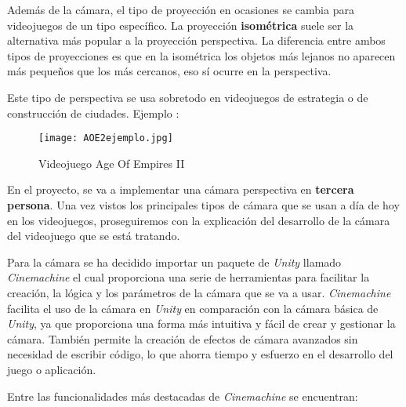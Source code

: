     Además de la cámara, el tipo de proyección en ocasiones se cambia para videojuegos de un tipo específico. La proyección \textbf{isométrica} suele ser la alternativa más popular a la proyección perspectiva. La diferencia entre ambos tipos de proyecciones es que en la isométrica los objetos más lejanos no aparecen más pequeños que los más cercanos, eso sí ocurre en la perspectiva.

    Este tipo de perspectiva se usa sobretodo en videojuegos de estrategia o de construcción de ciudades.
    Ejemplo : 
    \begin{figure}[H]
        \centering
        \texttt{[image: AOE2ejemplo.jpg]}
        \caption{Videojuego Age Of Empires II}
    \end{figure}

En el proyecto, se va a implementar una cámara perspectiva en \textbf{tercera persona}. Una vez vistos los principales tipos de cámara que se usan a día de hoy en los videojuegos, proseguiremos con la explicación
del desarrollo de la cámara del videojuego que se está tratando.

Para la cámara se ha decidido importar un paquete de \textit{Unity} llamado \textit{Cinemachine} \cite{UnityCinemachine} %
el cual proporciona una serie de herramientas para facilitar la creación, la lógica y los parámetros de la cámara 
que se va a usar.
\textit{Cinemachine} facilita el uso de la cámara en \textit{Unity} en comparación con la cámara básica de \textit{Unity}, ya que proporciona una forma más intuitiva y fácil de crear y gestionar la cámara. También permite la creación de efectos de cámara avanzados sin necesidad de escribir código, lo que ahorra tiempo y esfuerzo en el desarrollo del juego o aplicación.

Entre las funcionalidades más destacadas de \textit{Cinemachine} se encuentran:

